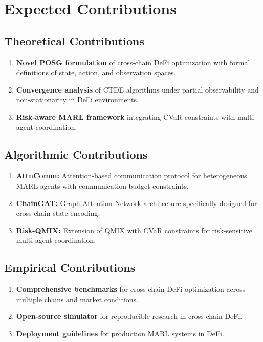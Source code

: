\documentclass[11pt,a4paper]{article}
\begin{document}
\section{Expected Contributions}\label{sec:contributions}

\subsection{Theoretical Contributions}

\begin{enumerate}[leftmargin=2em]
    \item \textbf{Novel POSG formulation} of cross-chain DeFi optimization with formal definitions of state, action, and observation spaces.
    
    \item \textbf{Convergence analysis} of CTDE algorithms under partial observability and non-stationarity in DeFi environments.
    
    \item \textbf{Risk-aware MARL framework} integrating CVaR constraints with multi-agent coordination.
\end{enumerate}

\subsection{Algorithmic Contributions}

\begin{enumerate}[leftmargin=2em]
    \item \textbf{AttnComm:} Attention-based communication protocol for heterogeneous MARL agents with communication budget constraints.
    
    \item \textbf{ChainGAT:} Graph Attention Network architecture specifically designed for cross-chain state encoding.
    
    \item \textbf{Risk-QMIX:} Extension of QMIX with CVaR constraints for risk-sensitive multi-agent coordination.
\end{enumerate}

\subsection{Empirical Contributions}

\begin{enumerate}[leftmargin=2em]
    \item \textbf{Comprehensive benchmarks} for cross-chain DeFi optimization across multiple chains and market conditions.
    
    \item \textbf{Open-source simulator} for reproducible research in cross-chain DeFi.
    
    \item \textbf{Deployment guidelines} for production MARL systems in DeFi.
\end{enumerate}
\end{document}
